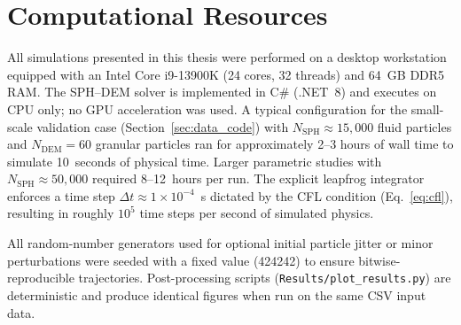 ﻿\section{Computational Resources}
\label{sec:computational_resources}

All simulations presented in this thesis were performed on a desktop workstation equipped with an Intel Core i9-13900K (24 cores, 32 threads) and 64~GB DDR5 RAM. The SPH--DEM solver is implemented in C\# (.NET~8) and executes on CPU only; no GPU acceleration was used. A typical configuration for the small-scale validation case (Section~\ref{sec:data_code}) with $N_{\text{SPH}} \approx 15{,}000$ fluid particles and $N_{\text{DEM}} = 60$ granular particles ran for approximately 2--3 hours of wall time to simulate 10~seconds of physical time. Larger parametric studies with $N_{\text{SPH}} \approx 50{,}000$ required 8--12~hours per run. The explicit leapfrog integrator enforces a time step $\Delta t \approx 1\times10^{-4}$~s dictated by the CFL condition (Eq.~\ref{eq:cfl}), resulting in roughly $10^5$ time steps per second of simulated physics.

All random-number generators used for optional initial particle jitter or minor perturbations were seeded with a fixed value (424242) to ensure bitwise-reproducible trajectories. Post-processing scripts (\texttt{Results/plot\_results.py}) are deterministic and produce identical figures when run on the same CSV input data.

